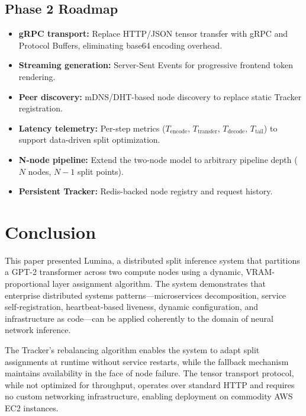 \documentclass[conference]{IEEEtran}
\begin{document}
\subsection{Phase 2 Roadmap}

\begin{itemize}
  \item \textbf{gRPC transport:} Replace HTTP/JSON tensor transfer with gRPC
        and Protocol Buffers, eliminating base64 encoding overhead.
  \item \textbf{Streaming generation:} Server-Sent Events for progressive
        frontend token rendering.
  \item \textbf{Peer discovery:} mDNS/DHT-based node discovery to replace
        static Tracker registration.
  \item \textbf{Latency telemetry:} Per-step metrics
        ($T_{\text{encode}}$, $T_{\text{transfer}}$, $T_{\text{decode}}$,
        $T_{\text{tail}}$) to support data-driven split optimization.
  \item \textbf{N-node pipeline:} Extend the two-node model to arbitrary
        pipeline depth ($N$ nodes, $N-1$ split points).
  \item \textbf{Persistent Tracker:} Redis-backed node registry and request
        history.
\end{itemize}

\section{Conclusion}

This paper presented Lumina, a distributed split inference system that
partitions a GPT-2 transformer across two compute nodes using a dynamic,
VRAM-proportional layer assignment algorithm. The system demonstrates that
enterprise distributed systems patterns---microservices decomposition, service
self-registration, heartbeat-based liveness, dynamic configuration, and
infrastructure as code---can be applied coherently to the domain of neural
network inference.

The Tracker's rebalancing algorithm enables the system to adapt split
assignments at runtime without service restarts, while the fallback mechanism
maintains availability in the face of node failure. The tensor transport
protocol, while not optimized for throughput, operates over standard HTTP and
requires no custom networking infrastructure, enabling deployment on commodity
AWS EC2 instances.
\end{document}
